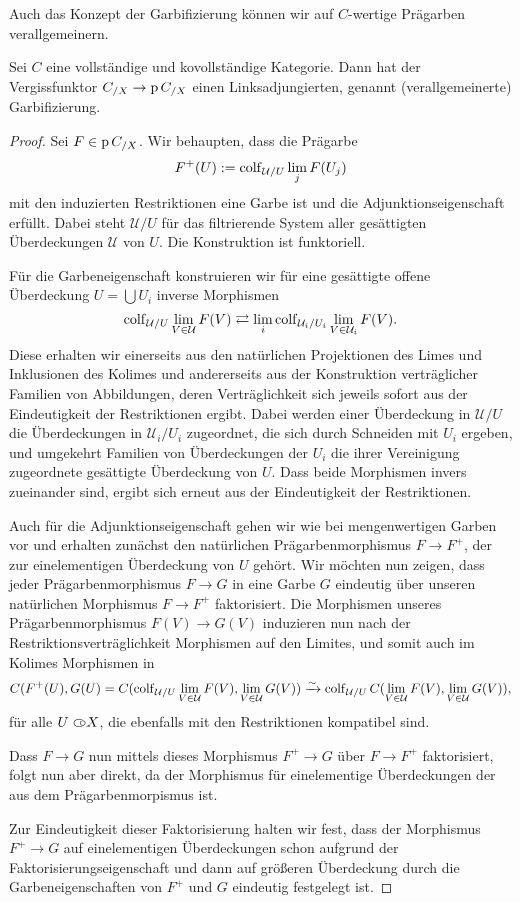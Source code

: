 Auch das Konzept der Garbifizierung können wir auf $C$-wertige
Prägarben verallgemeinern.
\begin{satz}
  Sei $C$ eine vollständige und kovollständige Kategorie. Dann hat der
  Vergissfunktor $C_{/X} \to \operatorname{p} C_{/X}$ einen Linksadjungierten,
  genannt (verallgemeinerte) Garbifizierung.
\end{satz}
\begin{proof}
  Sei $F \in \operatorname{p} C_{/X}$. Wir behaupten, dass die Prägarbe
  \[ F^+(U) :=   \operatorname{colf}\limits_{\mathcal{U}/U} \lim_j F(U_j) \]
  mit den induzierten Restriktionen eine Garbe ist und die
  Adjunktionseigenschaft erfüllt. Dabei steht $\mathcal{U}/U$ für das
  filtrierende System aller gesättigten Überdeckungen $\mathcal{U}$
  von $U$. Die Konstruktion ist funktoriell.

  Für die Garbeneigenschaft konstruieren wir für eine gesättigte
  offene Überdeckung $U = \bigcup U_i$ inverse Morphismen
  \[ \operatorname{colf}\limits_{\mathcal{U}/U} \lim_{V \in \mathcal{U}} F(V)
  \rightleftarrows
  \lim_i \operatorname{colf}\limits_{\mathcal{U}_i/U_i} \lim_{V \in \mathcal{U}_i} F(V). \]
  Diese erhalten wir einerseits aus den natürlichen Projektionen des
  Limes und Inklusionen des Kolimes und andererseits aus der
  Konstruktion verträglicher Familien von Abbildungen, deren
  Verträglichkeit sich jeweils sofort aus der Eindeutigkeit der
  Restriktionen ergibt. Dabei werden einer Überdeckung in
  $\mathcal{U}/U$ die Überdeckungen in $\mathcal{U}_i/U_i$ zugeordnet,
  die sich durch Schneiden mit $U_i$ ergeben, und umgekehrt Familien
  von Überdeckungen der $U_i$ die ihrer Vereinigung zugeordnete
  gesättigte Überdeckung von $U$. Dass beide Morphismen invers
  zueinander sind, ergibt sich erneut aus der Eindeutigkeit der
  Restriktionen.

  Auch für die Adjunktionseigenschaft gehen wir wie bei mengenwertigen
  Garben vor und erhalten zunächst den natürlichen Prägarbenmorphismus
  $F \to F^+$, der zur einelementigen Überdeckung von $U$ gehört. Wir
  möchten nun zeigen, dass jeder Prägarbenmorphismus $F \to G$ in eine
  Garbe $G$ eindeutig über unseren natürlichen Morphismus $F \to F^+$
  faktorisiert. Die Morphismen unseres Prägarbenmorphismus $F(V) \to
  G(V)$ induzieren nun nach der Restriktionsverträglichkeit Morphismen
  auf den Limites, und somit auch im Kolimes Morphismen in
  \[ C(F^+(U), G(U) =
     C(\operatorname{colf}\limits_{\mathcal{U}/U} \lim_{V \in \mathcal{U}} F(V),
     \lim_{V \in \mathcal{U}} G(V)) \xrightarrow[]{\sim}
     \operatorname{colf}\limits_{\mathcal{U}/U}
     C(\lim_{V \in \mathcal{U}} F(V), \lim_{V \in \mathcal{U}} G(V)), \]
  für alle $U \subset\kern-0.58em\circ X$, die ebenfalls mit den Restriktionen kompatibel
  sind.

  Dass $F \to G$ nun mittels dieses Morphismus $F^+ \to G$ über $F \to
  F^+$ faktorisiert, folgt nun aber direkt, da der Morphismus für
  einelementige Überdeckungen der aus dem Prägarbenmorpismus ist.

  Zur Eindeutigkeit dieser Faktorisierung halten wir fest, dass der
  Morphismus $F^+ \to G$ auf einelementigen Überdeckungen schon
  aufgrund der Faktorisierungseigenschaft und dann auf größeren
  Überdeckung durch die Garbeneigenschaften von $F^+$ und $G$
  eindeutig festgelegt ist.
\end{proof}

